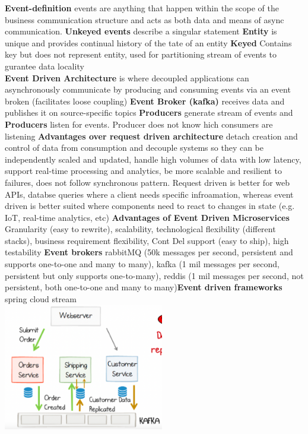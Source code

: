 \documentclass[10pt, landscape]{article}
\begin{document}
\begin{multicols}{4}
\textbf{Event-definition} events are anything that happen within the scope of the business communication structure and acts as both data and means of async communication. \textbf{Unkeyed events} describe a singular statement \textbf{Entity} is unique and provides continual history of the tate of an entity \textbf{Keyed} Contains key but does not represent entity, used for partitioning stream of events to gurantee data locality\\

\textbf{Event Driven Architecture} is where decoupled applications can asynchronously communicate by producing and consuming events via an event broken (facilitates loose coupling)  
\textbf{Event Broker (kafka)} receives data and publishes it on source-specific topics \textbf{Producers} generate stream of events and \textbf{Producers} listen for events. Producer does not know hich consumers are listening \textbf{Advantages over request driven architecture} detach creation and control of data from consumption and decouple systems so they can be independently scaled and updated, handle high volumes of data with low latency, support real-time processing and analytics, be more scalable and resilient to failures, does not follow synchronous pattern. Request driven is better for web APIs, databse queries where a client needs specific infroamation, whereas event driven is better suited where components need to react to changes in state (e.g. IoT, real-time analytics, etc) \textbf{Advantages of Event Driven Microservices} Granularity (easy to rewrite), scalability, technological flexibility (different stacks), business requirement flexibility, Cont Del support (easy to ship), high testability \textbf{Event brokers} rabbitMQ (50k messages per second, persistent and supports one-to-one and many to many), kafka (1 mil messages per second, persistent but only supports one-to-many), reddis (1 mil messages per second, not persistent, both one-to-one and many to many)\textbf{Event driven frameworks} spring cloud stream\\
\includegraphics*[width=7cm]{kafka.png}


\end{multicols}
\end{document}
